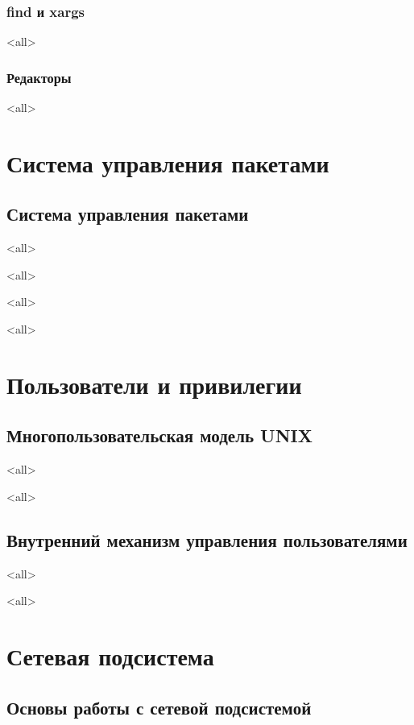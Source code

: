 \subsection{find и xargs}
\mode<all>{}

\subsection{Редакторы}
\mode<all>{}

\chapter{Система управления пакетами}
\section{Система управления пакетами}
\mode<all>{}

\mode<all>{}

\mode<all>{}

\mode<all>{}

\chapter{Пользователи и привилегии}

\section{Многопользовательская модель UNIX}
\mode<all>{}

\mode<all>{}
\section{Внутренний механизм управления пользователями}
\mode<all>{}

\mode<all>{}

\chapter{Сетевая подсистема}

\section{Основы работы с сетевой подсистемой}

